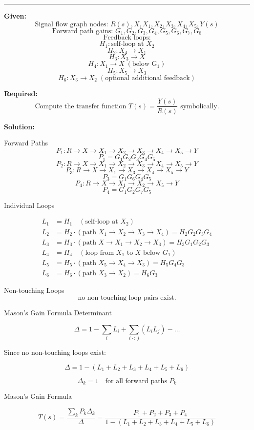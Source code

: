 \noindent\rule{\textwidth}{1pt}

\textbf{Given:}
\[
\text{Signal flow graph nodes: } R(s), X, X_1, X_2, X_3, X_4, X_5, Y(s)
\]
\[
\text{Forward path gains: } G_1, G_2, G_3, G_4, G_5, G_6, G_7, G_8
\]
\[
\text{Feedback loops:} 
\]
\[
H_1: \text{self-loop at } X_2
\]
\[
H_2: X_4 \to X_1
\]
\[
H_3: X_3 \to X
\]
\[
H_4: X_1 \to X \; (\text{below G}_1)
\]
\[
H_5: X_5 \to X_3
\]
\[
H_6: X_3 \to X_2 \; (\text{optional additional feedback})
\]

\textbf{Required:}
\[
\text{Compute the transfer function } T(s) = \frac{Y(s)}{R(s)} \text{ symbolically.}
\]

\textbf{Solution:}

Forward Paths
\[
P_1: R \to X \to X_1 \to X_2 \to X_3 \to X_4 \to X_5 \to Y
\]
\[
P_1 = G_1 G_2 G_3 G_4 G_5
\]
\[
P_2: R \to X \to X_1 \to X_2 \to X_3 \to X_4 \to X_5 \to Y 
\]
\[
P_3: R \to X \to X_1 \to X_3 \to X_4 \to X_5 \to Y
\]
\[
P_3 = G_1 G_6 G_4 G_5
\]
\[
P_4: R \to X \to X_1 \to X_2 \to X_5 \to Y
\]
\[
P_4 = G_1 G_2 G_7 G_5
\]

Individual Loops

\[
\begin{aligned}
L_1 &= H_1 \quad (\text{self-loop at } X_2)\\
L_2 &= H_2 \cdot (\text{path } X_1 \to X_2 \to X_3 \to X_4) = H_2 G_2 G_3 G_4\\
L_3 &= H_3 \cdot (\text{path } X \to X_1 \to X_2 \to X_3) = H_3 G_1 G_2 G_3\\
L_4 &= H_4 \quad (\text{loop from } X_1 \text{ to } X \text{ below } G_1)\\
L_5 &= H_5 \cdot (\text{path } X_5 \to X_4 \to X_3) = H_5 G_4 G_3\\
L_6 &= H_6 \cdot (\text{path } X_3 \to X_2) = H_6 G_3
\end{aligned}
\]

Non-touching Loops
\[
\text{no non-touching loop pairs exist.}
\]

Mason's Gain Formula Determinant

\[
\Delta = 1 - \sum_i L_i + \sum_{i<j} (L_i L_j) - \dots
\]

Since no non-touching loops exist:

\[
\Delta = 1 - (L_1 + L_2 + L_3 + L_4 + L_5 + L_6)
\]

\[
\Delta_k = 1 \quad \text{for all forward paths } P_k
\]

Mason's Gain Formula

\[
T(s) = \frac{\sum_k P_k \Delta_k}{\Delta} = \frac{P_1 + P_2 + P_3 + P_4}{1 - (L_1 + L_2 + L_3 + L_4 + L_5 + L_6)}
\]

